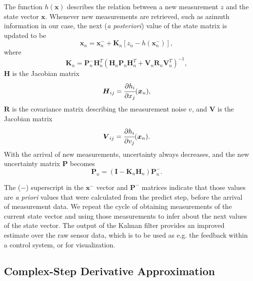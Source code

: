\documentclass[]{article}
\begin{document}
The function $h(\boldsymbol{x})$ describes the relation between a new measurement $z$ and the state vector $\boldsymbol{x}$. Whenever new measurements are retrieved, such as azimuth information in our case, the next (\textit{a posteriori}) value of the state matrix is updated to be
\begin{equation}
\label{equ:state_measure}
\boldsymbol{x}_{n} = \boldsymbol{x}_{n}^{-} + \boldsymbol{K}_{n}[z_{n}
- h(\boldsymbol{x}_{n}^{-})],
\end{equation}
where
\[ \boldsymbol{K}_{n} = \boldsymbol{P}_{n}^{-} \boldsymbol{H}_{n}^{T}
(\boldsymbol{H}_{n} \boldsymbol{P}_{n} \boldsymbol{H}_{n}^{T}
+\boldsymbol{V}_{n} \boldsymbol{R}_{n} \boldsymbol{V}_{n}^{T})^{-1}, \]
$\boldsymbol{H}$ is the Jacobian matrix
\[ \boldsymbol{H}_{ij} = \cfrac{\partial h_{i}}{\partial x_{j}}(\boldsymbol{x}_{n}), \]
$\boldsymbol{R}$ is the covariance matrix describing the measurement noise $v$, and $\boldsymbol{V}$ is the Jacobian matrix 
\[ \boldsymbol{V}_{ij} = \cfrac{\partial h_{i}}{\partial v_{j}}(\boldsymbol{x}_{n}). \]
With the arrival of new measurements, uncertainty always decreases, and the new uncertainty matrix $\boldsymbol{P}$ becomes
\begin{equation}
\boldsymbol{P}_{n} = (\boldsymbol{I} - \boldsymbol{K}_{n} \boldsymbol{H}_{n}) \boldsymbol{P}_{n}^{-}.
\label{equ:uncertainty_measure}
\end{equation}

The ($-$) superscript in the $\boldsymbol{x}^{-}$ vector and $\boldsymbol{P}^{-}$ matrices indicate that those values are \textit{a priori} values that were calculated from the predict step, before the arrival of measurement data. We repeat the cycle of obtaining measurements of the current state vector and using those measurements to infer about the next values of the state vector. The output of the Kalman filter provides an improved estimate over the raw sensor data, which is to be used as e.g. the feedback within a control system, or for visualization.

\subsection{Complex-Step Derivative Approximation}
\end{document}
